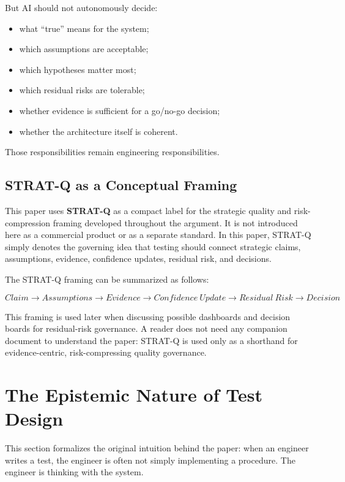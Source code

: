 \documentclass[11pt,a4paper]{article}
\begin{document}
But AI should not autonomously decide:
\begin{itemize}
\item what ``true'' means for the system;
\item which assumptions are acceptable;
\item which hypotheses matter most;
\item which residual risks are tolerable;
\item whether evidence is sufficient for a go/no-go decision;
\item whether the architecture itself is coherent.
\end{itemize}

Those responsibilities remain engineering responsibilities.

\subsection{STRAT-Q as a Conceptual Framing}

This paper uses \textbf{STRAT-Q} as a compact label for the strategic quality and risk-compression framing developed throughout the argument. It is not introduced here as a commercial product or as a separate standard. In this paper, STRAT-Q simply denotes the governing idea that testing should connect strategic claims, assumptions, evidence, confidence updates, residual risk, and decisions.

The STRAT-Q framing can be summarized as follows:

\[
Claim \rightarrow Assumptions \rightarrow Evidence \rightarrow Confidence\ Update \rightarrow Residual\ Risk \rightarrow Decision
\]

This framing is used later when discussing possible dashboards and decision boards for residual-risk governance. A reader does not need any companion document to understand the paper: STRAT-Q is used only as a shorthand for evidence-centric, risk-compressing quality governance.

\section{The Epistemic Nature of Test Design}

This section formalizes the original intuition behind the paper: when an engineer writes a test, the engineer is often not simply implementing a procedure. The engineer is thinking with the system.
\end{document}
